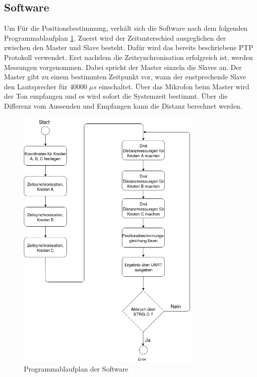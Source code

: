 \subsection{Software}
Um Für die Positionsbestimmung, verhält sich die Software nach dem folgenden Programmablaufplan \ref{img:PAP}. Zuerst wird der Zeitunterschied ausgeglichen der zwischen den Master und Slave besteht. Dafür wird das bereits beschriebene PTP Protokoll verwendet. Erst nachdem die Zeitsynchronisation erfolgreich ist, werden Messungen vorgenommen. Dabei spricht der Master einzeln die Slaves an. Der Master gibt zu einem bestimmten Zeitpunkt vor, wann der enstprechende Slave den Lautsprecher für $40000 \; \mu s$ einschaltet. Über das Mikrofon beim Master wird der Ton empfangen und es wird sofort die Systemzeit bestimmt. Über die Differenz vom Aussenden und Empfangen kann die Distanz berechnet werden.
\begin{figure}[H]
        \centering
        \includegraphics[width=0.8\textwidth]{images/PAP.png}
        \caption{Programmablaufplan der Software}
        \label{img:PAP}
\end{figure}

